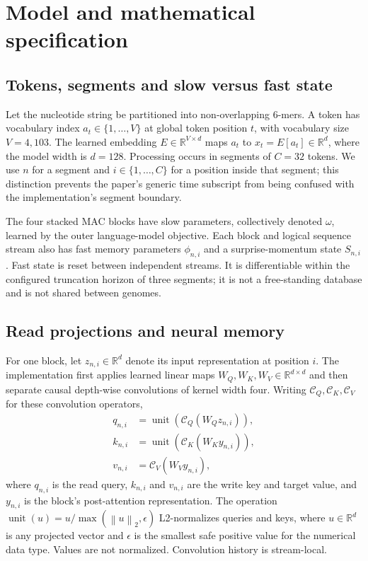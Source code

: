 \documentclass[10pt,twocolumn]{article}
\newcommand{\R}{\mathbb{R}}
\newcommand{\norm}[1]{\left\lVert#1\right\rVert}
\begin{document}
\section*{Model and mathematical specification}
\subsection*{Tokens, segments and slow versus fast state}
Let the nucleotide string be partitioned into non-overlapping 6-mers. A token has vocabulary index $a_t\in\{1,\ldots,V\}$ at global token position $t$, with vocabulary size $V=4{,}103$. The learned embedding $E\in\R^{V\times d}$ maps $a_t$ to $x_t=E[a_t]\in\R^d$, where the model width is $d=128$. Processing occurs in segments of $C=32$ tokens. We use $n$ for a segment and $i\in\{1,\ldots,C\}$ for a position inside that segment; this distinction prevents the paper's generic time subscript from being confused with the implementation's segment boundary.

The four stacked MAC blocks have slow parameters, collectively denoted $\omega$, learned by the outer language-model objective. Each block and logical sequence stream also has fast memory parameters $\phi_{n,i}$ and a surprise-momentum state $S_{n,i}$. Fast state is reset between independent streams. It is differentiable within the configured truncation horizon of three segments; it is not a free-standing database and is not shared between genomes.

\subsection*{Read projections and neural memory}
For one block, let $z_{n,i}\in\R^d$ denote its input representation at position $i$. The implementation first applies learned linear maps $W_Q,W_K,W_V\in\R^{d\times d}$ and then separate causal depth-wise convolutions of kernel width four. Writing $\mathcal C_Q,\mathcal C_K,\mathcal C_V$ for these convolution operators,
\begin{align}
q_{n,i}&=\operatorname{unit}\!\left(\mathcal C_Q(W_Qz_{n,i})\right),\label{eq:q}\\
k_{n,i}&=\operatorname{unit}\!\left(\mathcal C_K(W_Ky_{n,i})\right),\label{eq:k}\\
v_{n,i}&=\mathcal C_V(W_Vy_{n,i}),\label{eq:v}
\end{align}
where $q_{n,i}$ is the read query, $k_{n,i}$ and $v_{n,i}$ are the write key and target value, and $y_{n,i}$ is the block's post-attention representation. The operation $\operatorname{unit}(u)=u/\max(\norm{u}_2,\epsilon)$ L2-normalizes queries and keys, where $u\in\R^d$ is any projected vector and $\epsilon$ is the smallest safe positive value for the numerical data type. Values are not normalized. Convolution history is stream-local.
\end{document}
